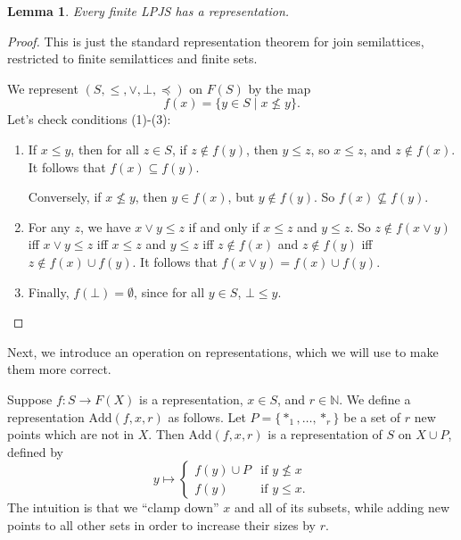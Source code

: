\documentclass[12pt]{article}
\newcommand{\Add}{\text{Add}}
\newtheorem{lemma}{Lemma}
\begin{document}
\begin{lemma}\label{lem:base}
Every finite LPJS has a representation. 
\end{lemma}
\begin{proof}
This is just the standard representation theorem for join semilattices, restricted to finite semilattices and finite sets. 

We represent $(S,\leq,\vee,\bot,\preceq)$ on $F(S)$ by the map $$f(x) = \{y\in S\mid x\not\leq y\}.$$
Let's check conditions (1)-(3):
\begin{enumerate}[(1)]
\item If $x\leq y$, then for all $z\in S$, if $z\notin f(y)$, then $y\leq z$, so $x\leq z$, and $z\notin f(x)$. It follows that $f(x)\subseteq f(y)$. 

Conversely, if $x\not\leq y$, then $y\in f(x)$, but $y\notin f(y)$. So $f(x)\not\subseteq f(y)$.

\item For any $z$, we have $x\vee y\leq z$ if and only if $x \leq z$ and $y\leq z$. So $z\notin f(x\vee y)$ iff $x\lor y \leq z$ iff $x\leq z$ and $y\leq z$ iff $z\notin f(x)$ and $z\notin f(y)$ iff $z\notin f(x)\cup f(y)$. It follows that $f(x\vee y) = f(x) \cup f(y)$. 

\item Finally, $f(\bot) = \emptyset$, since for all $y\in S$, $\bot \leq y$. \qedhere
\end{enumerate}
\end{proof}

Next, we introduce an operation on representations, which we will use to make them more correct. 

Suppose $f\colon S\to F(X)$ is a representation, $x\in S$, and $r\in \mathbb{N}$. We define a  representation $\Add(f,x,r)$ as follows. Let $P = \{*_1,\dots,*_r\}$ be a set of $r$ new points which are not in $X$. Then $\Add(f,x,r)$ is a representation of $S$ on $X\cup P$, defined by $$y\mapsto \begin{cases} f(y)\cup P & \text{if }y\not\leq x\\ f(y) &\text{if }y\leq x.
\end{cases}$$
The intuition is that we ``clamp down'' $x$ and all of its subsets, while adding new points to all other sets in order to increase their sizes by $r$. 
\end{document}
